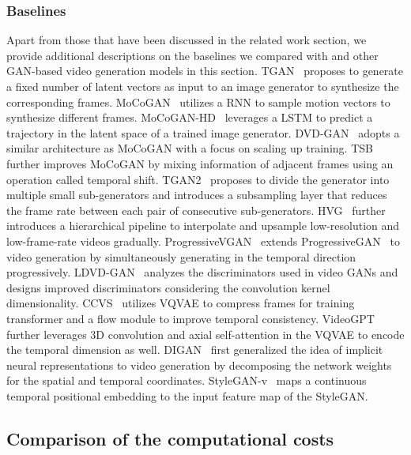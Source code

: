 \subsubsection{Baselines}
Apart from those that have been discussed in the related work section, we provide additional descriptions on the baselines we compared with and other GAN-based video generation models in this section. TGAN~\cite{saito2017temporal} proposes to generate a fixed number of latent vectors as input to an image generator to synthesize the corresponding frames. MoCoGAN~\cite{Tulyakov_2018_CVPR} utilizes a RNN to sample motion vectors to synthesize different frames. MoCoGAN-HD~\cite{tian2021a} leverages a LSTM to predict a trajectory in the latent space of a trained image generator.  DVD-GAN~\cite{clark2019adversarial} adopts a similar architecture as MoCoGAN with a focus on scaling up training. TSB~\cite{munoz2021temporal} further improves  MoCoGAN by mixing information of adjacent frames using an operation called temporal shift. 
TGAN2~\cite{saito2020train} proposes to divide the generator into multiple small sub-generators and introduces a subsampling layer that reduces the frame rate between each pair of consecutive sub-generators. 
HVG~\cite{castrejon2021hierarchical} further introduces a hierarchical pipeline to interpolate and upsample low-resolution and low-frame-rate videos gradually. 
ProgressiveVGAN~\cite{acharya2018towards} extends ProgressiveGAN~\cite{karras2018progressive} to video generation by simultaneously generating in the temporal direction progressively. LDVD-GAN~\cite{kahembwe2020lower} analyzes the discriminators used in video GANs and designs improved discriminators considering the convolution kernel dimensionality. CCVS~\cite{le2021ccvs} utilizes VQVAE to compress frames for training transformer and a flow module to improve temporal consistency. VideoGPT~\cite{yan2021videogpt} further leverages 3D convolution and axial self-attention in the VQVAE to encode the temporal dimension as well. 
DIGAN~\cite{yu2021generating} first generalized the idea of implicit neural representations to video generation by decomposing the network weights for the spatial and temporal coordinates. StyleGAN-v~\cite{skorokhodov2021stylegan} maps a continuous temporal positional embedding to the input feature map of the StyleGAN.

\subsection{Comparison of the computational costs}

